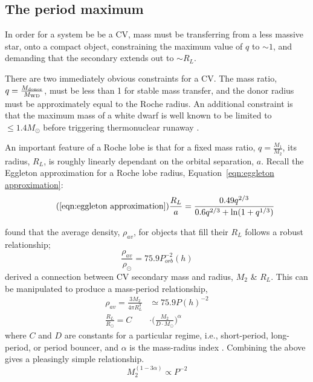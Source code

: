\subsection{The period maximum}
\label{sect:introduction:period maximum}
In order for a system be be a CV, mass must be transferring from a less massive star, onto a compact object, constraining the maximum value of $q$ to $\sim1$, and demanding that the secondary extends out to $\sim R_L$. 

There are two immediately obvious constraints for a CV. The mass ratio, $q = \frac{M_{\rm donor}}{M_{\rm WD}}$, must be less than 1 for stable mass transfer, and the donor radius must be approximately equal to the Roche radius.
An additional constraint is that the maximum mass of a white dwarf is well known to be limited to $\le 1.4M_{\odot}$ before triggering thermonuclear runaway \citep{chandrasekhar1942}.

An important feature of a Roche lobe is that for a fixed mass ratio, $q=\frac{M_1}{M_2}$, its radius, $R_L$, is roughly linearly dependant on the orbital separation, $a$. Recall the Eggleton approximation for a Roche lobe radius, Equation~\ref{eqn:eggleton approximation}:
\begin{equation}
    \tag{\ref{eqn:eggleton approximation}}
    \frac{R_L}{a} = \frac{0.49 q^{2/3}}{0.6 q^{2/3} + \mathrm{ln}(1 + q^{1/3})}
\end{equation}

\citet{warner1995} found that the average density, $\rho_{av}$, for objects that fill their $R_L$ follows a robust relationship;
\begin{equation}
    \frac{\rho_{av}}{\rho_{\odot}} = 75.9 P_{orb}^{-2}(h)
\end{equation}
\citet{knigge11} derived a connection between CV secondary mass and radius, $M_2$ \& $R_L$. This can be manipulated to produce a mass-period relationship,
\begin{align}
    \rho_{av} = \frac{3 M_2}{4 \pi R_L^3} &\simeq 75.9 P(h)^{-2} \\
    \frac{R_L}{R_\odot} = C &\cdot \Big( \frac{M_2}{D \cdot M_\odot} \Big) ^{\alpha}
\end{align}
where $C$ and $D$ are constants for a particular regime, i.e., short-period, long-period, or period bouncer, and $\alpha$ is the mass-radius index \citep{Knigge2011b}.
Combining the above gives a pleasingly simple relationship.
\begin{equation}
\label{eqn:MP_relation}
    M_2^{(1-3\alpha)} \propto P^{-2}
\end{equation}

